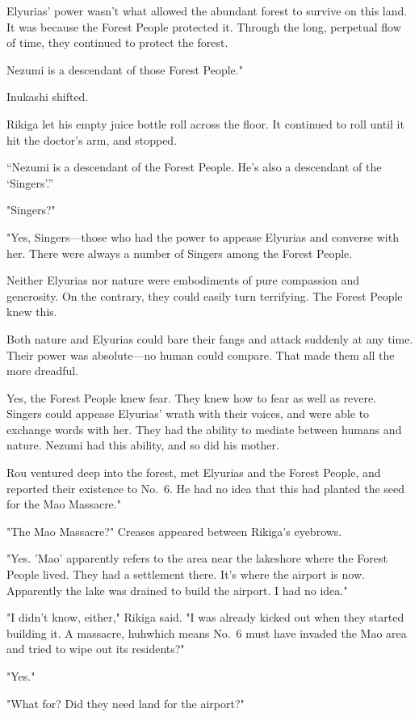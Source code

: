 Elyurias' power wasn't what allowed the abundant forest to survive on
this land. It was because the Forest People protected it. Through the
long, perpetual flow of time, they continued to protect the forest.

Nezumi is a descendant of those Forest People."

Inukashi shifted.

Rikiga let his empty juice bottle roll across the floor. It continued to
roll until it hit the doctor's arm, and stopped.

\enquote{Nezumi is a descendant of the Forest People. He's also a descendant of
the \enquote{Singers}.}

"Singers?"

"Yes, Singers---those who had the power to appease Elyurias and converse
with her. There were always a number of Singers among the Forest
People.

Neither Elyurias nor nature were embodiments of pure compassion and
generosity. On the contrary, they could easily turn terrifying. The
Forest People knew this.

Both nature and Elyurias could bare their fangs and attack suddenly at
any time. Their power was absolute---no human could compare. That made
them all the more dreadful.

Yes, the Forest People knew fear. They knew how to fear as well as
revere. Singers could appease Elyurias' wrath with their voices, and
were able to exchange words with her. They had the ability to mediate
between humans and nature. Nezumi had this ability, and so did his
mother.

Rou ventured deep into the forest, met Elyurias and the Forest People,
and reported their existence to No.~6. He had no idea that this had
planted the seed for the Mao Massacre."

"The Mao Massacre?" Creases appeared between Rikiga's eyebrows.

"Yes. 'Mao' apparently refers to the area near the lakeshore where the
Forest People lived. They had a settlement there. It's where the airport
is now. Apparently the lake was drained to build the airport. I had no
idea."

"I didn't know, either," Rikiga said. "I was already kicked out when
they started building it. A massacre, huh\el which means No.~6 must have
invaded the Mao area and tried to wipe out its residents?"

"Yes."

"What for? Did they need land for the airport?"

